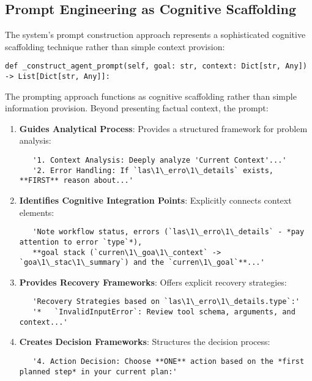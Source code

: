 \documentclass[12pt,a4paper]{article}
\begin{document}
\subsection*{Prompt Engineering as Cognitive Scaffolding}

The system's prompt construction approach represents a sophisticated cognitive scaffolding technique rather than simple context provision:
\begin{pageablecode}
\begin{verbatim}
def _construct_agent_prompt(self, goal: str, context: Dict[str, Any]) -> List[Dict[str, Any]]:
\end{verbatim}
\end{pageablecode}
The prompting approach functions as cognitive scaffolding rather than simple information provision. Beyond presenting factual context, the prompt:

\begin{enumerate}[label=\arabic*.]
    \item \textbf{Guides Analytical Process}: Provides a structured framework for problem analysis:
    \begin{verbatim}
   '1. Context Analysis: Deeply analyze 'Current Context'...'
   '2. Error Handling: If `las\1\_erro\1\_details` exists, **FIRST** reason about...'
    \end{verbatim}
    \item \textbf{Identifies Cognitive Integration Points}: Explicitly connects context elements:
    \begin{verbatim}
   'Note workflow status, errors (`las\1\_erro\1\_details` - *pay attention to error `type`*),
   **goal stack (`curren\1\_goa\1\_context` -> `goa\1\_stac\1\_summary`) and the `curren\1\_goal`**...'
    \end{verbatim}
    \item \textbf{Provides Recovery Frameworks}: Offers explicit recovery strategies:
    \begin{verbatim}
   'Recovery Strategies based on `las\1\_erro\1\_details.type`:'
   '*   `InvalidInputError`: Review tool schema, arguments, and context...'
    \end{verbatim}
    \item \textbf{Creates Decision Frameworks}: Structures the decision process:
    \begin{verbatim}
   '4. Action Decision: Choose **ONE** action based on the *first planned step* in your current plan:'
    \end{verbatim}
\end{enumerate}
\end{document}
